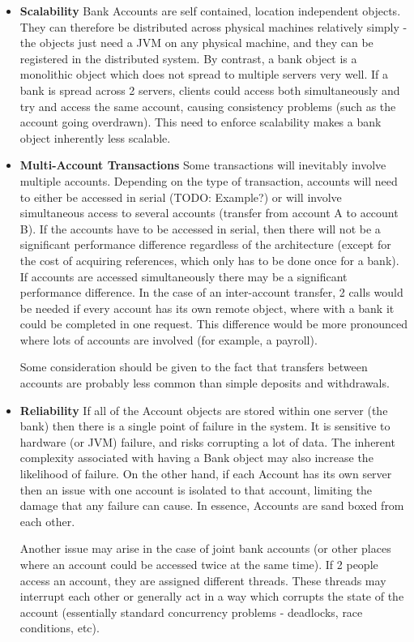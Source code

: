 \documentclass{article}
\begin{document}
\begin{itemize}
    \item \textbf{Scalability}
    Bank Accounts are self contained, location independent objects. They can therefore be distributed across physical machines relatively simply - the objects just need a JVM on any physical machine, and they can be registered in the distributed system. By contrast, a bank object is a monolithic object which does not spread to multiple servers very well. If a bank is spread across 2 servers, clients could access both simultaneously and try and access the same account, causing consistency problems (such as the account going overdrawn). This need to enforce scalability makes a bank object inherently less scalable. 

    \item \textbf{Multi-Account Transactions}
    Some transactions will inevitably involve multiple accounts. Depending on the type of transaction, accounts will need to either be accessed in serial (TODO: Example?) or will involve simultaneous access to several accounts (transfer from account A to account B). If the accounts have to be accessed in serial, then there will not be a significant performance difference regardless of the architecture (except for the cost of acquiring references, which only has to be done once for a bank). If accounts are accessed simultaneously there may be a significant performance difference. In the case of an inter-account transfer, 2 calls would be needed if every account has its own remote object, where with a bank it could be completed in one request. This difference would be more pronounced where lots of accounts are involved (for example, a payroll). 

    Some consideration should be given to the fact that transfers between accounts are probably less common than simple deposits and withdrawals.

    \item \textbf{Reliability}
    If all of the Account objects are stored within one server (the bank) then there is a single point of failure in the system. It is sensitive to hardware (or JVM) failure, and risks corrupting a lot of data. The inherent complexity associated with having a Bank object may also increase the likelihood of failure. On the other hand, if each Account has its own server then an issue with one account is isolated to that account, limiting the damage that any failure can cause. In essence, Accounts are sand boxed from each other.

    Another issue may arise in the case of joint bank accounts (or other places where an account could be accessed twice at the same time). If 2 people access an account, they are assigned different threads. These threads may interrupt each other or generally act in a way which corrupts the state of the account (essentially standard concurrency problems - deadlocks, race conditions, etc).
\end{itemize}
\end{document}
